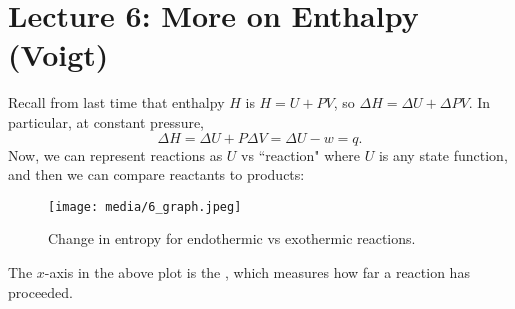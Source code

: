 \section*{Lecture 6: More on Enthalpy (Voigt)}
\setcounter{section}{6}
\setcounter{subsection}{0}
\setcounter{defn}{0}
\setcounter{defncontainer}{0}

Recall from last time that enthalpy $H$ is $H = U + PV$, so $\Delta H = \Delta U + \Delta PV$. 
In particular, at constant pressure, \[
	\Delta H = \Delta U + P\Delta V = \Delta U - w = q.
\]
Now, we can represent reactions as $U$ vs ``reaction" where $U$ is any state function, and then we can compare reactants to products:
\begin{figure}[h!]
	\centering
	\texttt{[image: media/6\_graph.jpeg]}
	\caption{Change in entropy for endothermic vs exothermic reactions.}
\end{figure}
\begin{defn}
	The $x$-axis in the above plot is the , which measures how far a reaction has proceeded.
\end{defn}
